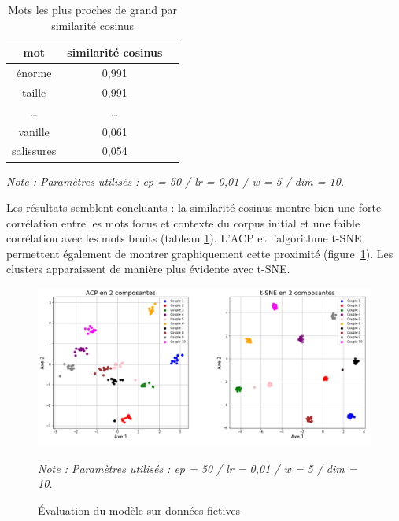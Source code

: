 \documentclass[11pt,french,french]{article}
\begin{document}
\begin{table}
\begin{center}
\begin{tabular}{|c|c|c|}
    \hline
    mot & similarité cosinus \tabularnewline
    \hline
    énorme & 0,991   \tabularnewline
    taille & 0,991   \tabularnewline
    \dots & \dots    \tabularnewline
    vanille & 0,061   \tabularnewline
    salissures & 0,054   \tabularnewline
    \hline
 \end{tabular}
\captionsetup{margin=0cm,format=hang,justification=justified}
\caption{Mots les plus proches de \og grand \fg{} par similarité cosinus}\label{table:tableau_evaluation}
\end{center}
\vspace{-0.3cm}
\footnotesize
\emph{Note : Paramètres utilisés : ep = 50 / lr = 0,01 / w = 5 / dim = 10.}
\end{table}

Les résultats semblent concluants : la similarité cosinus montre bien une forte corrélation entre les mots focus et contexte du corpus initial et une faible corrélation avec les mots bruits (tableau \ref{table:tableau_evaluation}). L'ACP et l'algorithme t-SNE permettent également de montrer graphiquement cette proximité (figure~\ref{fig:figure_evaluation}). Les clusters apparaissent de manière plus évidente avec t-SNE.

\begin{figure}
\begin{center}
\includegraphics[width=1\textwidth]{img/figures.png}
\captionsetup{margin=0cm,format=hang,justification=justified}
\caption{Évaluation du modèle sur données fictives}\label{fig:figure_evaluation}
\end{center}
\vspace{-0.3cm}
\footnotesize
\emph{Note : Paramètres utilisés : ep = 50 / lr = 0,01 / w = 5 / dim = 10.}
\end{figure}
\end{document}
